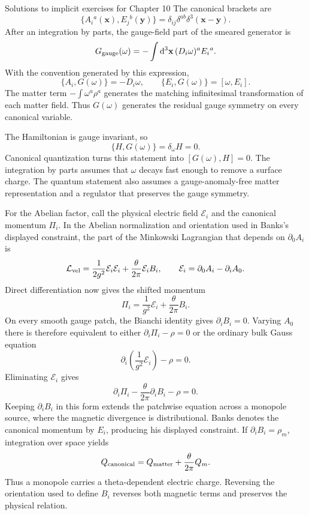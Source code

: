 \begin{bankssolutions}{Solutions to implicit exercises for Chapter 10}
The canonical brackets are
\[
  \{A_i{}^a(\mathbf x),E_j{}^b(\mathbf y)\}
  =\delta_{ij}\delta^{ab}\delta^3(\mathbf x-\mathbf y).
\]
After an integration by parts, the gauge-field part of the smeared generator
is
\[
  G_{\rm gauge}(\omega)
  =-\int\mathop{}\!\mathrm{d}^3\mathbf x\,(D_i\omega)^aE_i{}^a.
\]
With the convention generated by this expression,
\[
  \{A_i,G(\omega)\}=-D_i\omega,
  \qquad
  \{E_i,G(\omega)\}=[\omega,E_i].
\]
The matter term $-\int\omega^a\rho^a$ generates the matching infinitesimal
transformation of each matter field.  Thus $G(\omega)$ generates the residual
gauge symmetry on every canonical variable.

The Hamiltonian is gauge invariant, so
\[
  \{H,G(\omega)\}=\delta_\omega H=0.
\]
Canonical quantization turns this statement into
$[G(\omega),H]=0$.  The integration by parts assumes that $\omega$ decays fast
enough to remove a surface charge.  The quantum statement also assumes a
gauge-anomaly-free matter representation and a regulator that preserves the
gauge symmetry.

For the Abelian factor, call the physical electric field $\mathcal E_i$ and
the canonical momentum $\Pi_i$.  In the Abelian normalization and orientation
used in Banks's displayed constraint, the part of the Minkowski Lagrangian
that depends on $\partial_0A_i$ is
\[
  \mathcal L_{\rm vel}
  =\frac1{2g^2}\mathcal E_i\mathcal E_i
   +\frac{\theta}{2\pi}\mathcal E_iB_i,
  \qquad
  \mathcal E_i=\partial_0A_i-\partial_iA_0.
\]
Direct differentiation now gives the shifted momentum
\[
  \Pi_i=\frac1{g^2}\mathcal E_i+\frac{\theta}{2\pi}B_i.
\]
On every smooth gauge patch, the Bianchi identity gives
$\partial_iB_i=0$.  Varying $A_0$ there is therefore equivalent to either
$\partial_i\Pi_i-\rho=0$ or the ordinary bulk Gauss equation
\[
  \partial_i\left(\frac1{g^2}\mathcal E_i\right)-\rho=0.
\]
Eliminating $\mathcal E_i$ gives
\[
  \partial_i\Pi_i-\frac{\theta}{2\pi}\partial_iB_i-\rho=0.
\]
Keeping $\partial_iB_i$ in this form extends the patchwise equation across a
monopole source, where the magnetic divergence is distributional.
Banks denotes the canonical momentum by $E_i$, producing his displayed
constraint.  If $\partial_iB_i=\rho_m$, integration over space yields
\[
  Q_{\rm canonical}=Q_{\rm matter}+\frac{\theta}{2\pi}Q_m.
\]
Thus a monopole carries a theta-dependent electric charge.  Reversing the
orientation used to define $B_i$ reverses both magnetic terms and preserves
the physical relation.


\end{bankssolutions}
